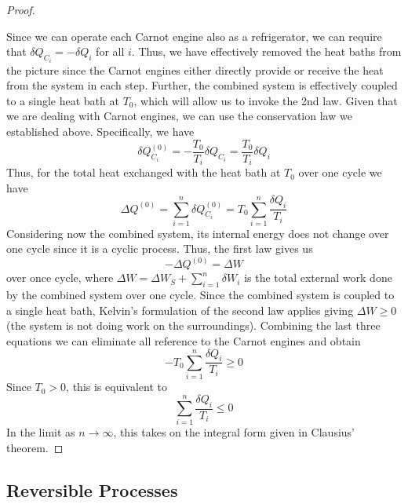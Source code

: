 \documentclass[12pt, a4paper, oneside, openright, titlepage]{book}
\begin{document}
\begin{proof}
\begin{center}
\begin{tikzpicture}[x=0.75pt,y=0.75pt,yscale=-1,xscale=1]
\end{tikzpicture}
\end{center}
    Since we can operate each Carnot engine also as a refrigerator, we can require that $\delta Q_{C_i} = -\delta Q_i$ for all $i$. Thus, we have effectively removed the heat baths from the picture since the Carnot engines either directly provide or receive the heat from the system in each step. Further, the combined system is effectively coupled to a single heat bath at $T_0$, which will allow us to invoke the 2nd law. Given that we are dealing with Carnot engines, we can use the conservation law we established above. Specifically, we have \begin{equation*}
        \delta Q_{C_i}^{(0)} = -\frac{T_0}{T_i}\delta Q_{C_i} = \frac{T_0}{T_i}\delta Q_i
    \end{equation*}
    Thus, for the total heat exchanged with the heat bath at $T_0$ over one cycle we have \begin{equation*}
        \Delta Q^{(0)} = \sum_{i=1}^n\delta Q_{C_i}^{(0)} = T_0\sum_{i=1}^n\frac{\delta Q_i}{T_i}
    \end{equation*}
    Considering now the combined system, its internal energy does not change over one cycle since it is a cyclic process. Thus, the first law gives us \begin{equation*}
        -\Delta Q^{(0)} = \Delta W
    \end{equation*}
    over once cycle, where $\Delta W = \Delta W_S + \sum_{i=1}^n\delta W_i$ is the total external work done by the combined system over one cycle. Since the combined system is coupled to a single heat bath, Kelvin's formulation of the second law applies giving $\Delta W \geq 0$ (the system is not doing work on the surroundings). Combining the last three equations we can eliminate all reference to the Carnot engines and obtain \begin{equation*}
        -T_0\sum_{i=1}^n\frac{\delta Q_i}{T_i} \geq 0
    \end{equation*}
    Since $T_0 > 0$, this is equivalent to \begin{equation*}
        \sum_{i=1}^n\frac{\delta Q_i}{T_i}\leq 0
    \end{equation*}
    In the limit as $n\rightarrow \infty$, this takes on the integral form given in Clausius' theorem.
\end{proof}


\subsection{Reversible Processes}
\end{document}
